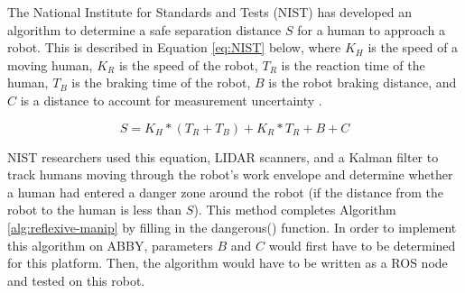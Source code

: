 \documentclass[]{cwru} %
\begin{document}
The National Institute for Standards and Tests (NIST) has developed an
algorithm to determine a safe separation distance $S$ for a human to
approach a robot. This is described in Equation \ref{eq:NIST} below, where
$K_H$ is the speed of a moving human, $K_R$ is
the speed of the robot, $T_R$ is the reaction time of the
human, $T_B$ is the braking time of the robot, $B$ is the
robot braking distance, and $C$ is a distance to account for measurement
uncertainty \cite{shackleford}.

\begin{equation}
\label{eq:NIST}
S = K_{H} * ( T_{R} + T_{B} ) + K_{R} * T_{R} + B + C
\end{equation}

NIST researchers used this equation, LIDAR scanners, and a Kalman filter
to track humans moving through the robot's work envelope and determine
whether a human had entered a danger zone around the robot (if the
distance from the robot to the human is less than $S$). This method
completes Algorithm \ref{alg:reflexive-manip} by filling in the dangerous() function. In order
to implement this algorithm on ABBY, parameters $B$ and $C$ would first have
to be determined for this platform. Then, the algorithm would have to be
written as a ROS node and tested on this robot.

\backmatter



\end{document}
